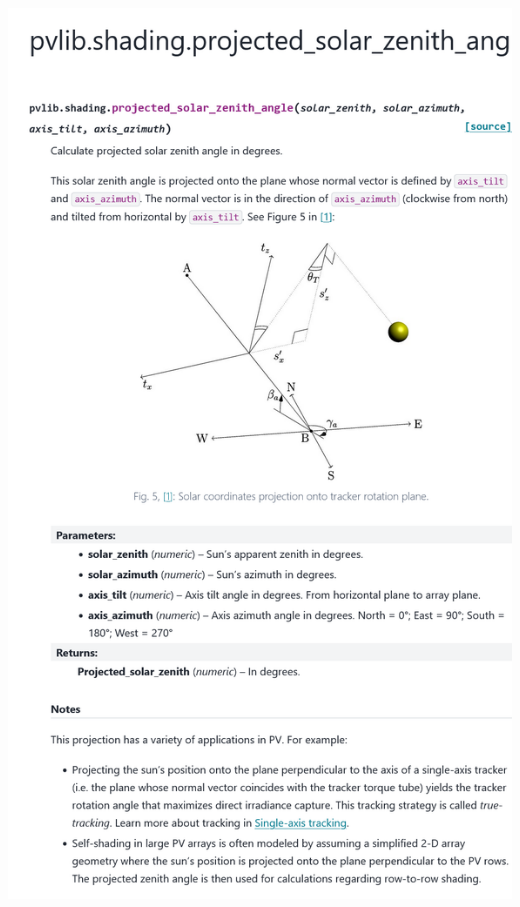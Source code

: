 \begin{myparindent}{0pt}
\includegraphics[width=\linewidth,height=0.9\textheight,keepaspectratio]{images/docs_funcs_cut/projected_solar_zenith_angle_0.png}


\end{myparindent}
